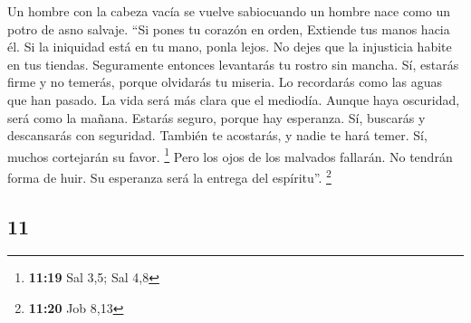 \begin{paracol}{2}
 Un hombre con la cabeza vacía se vuelve sabiocuando un
hombre nace como un potro de asno salvaje.  ``Si pones tu
corazón en orden, Extiende tus manos hacia él.  Si la
iniquidad está en tu mano, ponla lejos. No dejes que la injusticia
habite en tus tiendas.  Seguramente entonces levantarás
tu rostro sin mancha. Sí, estarás firme y no temerás, 
porque olvidarás tu miseria. Lo recordarás como las aguas que han
pasado.  La vida será más clara que el mediodía. Aunque
haya oscuridad, será como la mañana.  Estarás seguro,
porque hay esperanza. Sí, buscarás y descansarás con seguridad.
 También te acostarás, y nadie te hará temer. Sí, muchos
cortejarán su favor. \footnote{\textbf{11:19} Sal 3,5; Sal 4,8}
 Pero los ojos de los malvados fallarán. No tendrán forma
de huir. Su esperanza será la entrega del espíritu''. \footnote{\textbf{11:20}
  Job 8,13}

\switchcolumn
\begin{otherlanguage}{english}

\hypertarget{section-21}{%
\section{11}\label{section-21}}


\end{otherlanguage}
\end{paracol}
